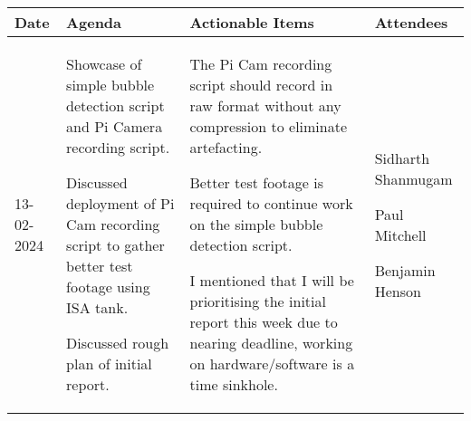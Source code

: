 \begin{table}[!h]
    \centering
    \begin{tabularx}{\textwidth}{|l|X|X|X|}
        \hline
        Date & Agenda & Actionable Items & Attendees \\
        \hline
        \hline
        13-02-2024 & 
        \begin{myitemize}
            \item Showcase of simple bubble detection script and Pi Camera recording script.
            \item Discussed deployment of Pi Cam recording script to gather better test footage using ISA tank.
            \item Discussed rough plan of initial report.
        \end{myitemize} & 
        \begin{myitemize}
            \item The Pi Cam recording script should record in raw format without any compression to eliminate artefacting.
            \item Better test footage is required to continue work on the simple bubble detection script.
            \item I mentioned that I will be prioritising the initial report this week due to nearing deadline, working on hardware/software is a time sinkhole.
        \end{myitemize} & 
        \begin{myitemize}
            \item Sidharth Shanmugam
            \item Paul Mitchell
            \item Benjamin Henson
        \end{myitemize} \\
        \hline
    \end{tabularx}
\end{table}
